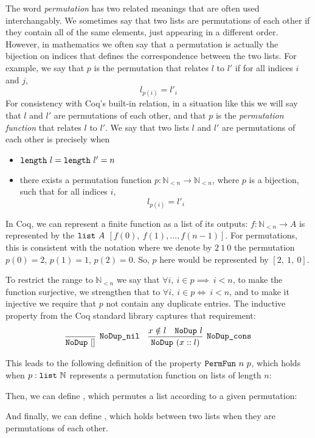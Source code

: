 \documentclass[11pt]{thesis}
\begin{document}
The word \textit{permutation} has two related meanings that are often
used interchangably. We sometimes say that two lists are permutations of each
other if they contain all of the same elements, just appearing in a
different order. However, in mathematics we often say that a
permutation is actually the bijection on indices that defines the
correspondence between the two lists. For example, we say that $p$ is
the permutation that relates $l$ to $l'$ if for all indices $i$ and
$j$,
\begin{equation*}
  l_{p(i)} = l'_i
\end{equation*}
For consistency with Coq's built-in  relation, in a
situation like this we will say that $l$ and $l'$ are permutations of
each other, and that $p$ is the \textit{permutation function} that
relates $l$ to $l'$. We say that two lists $l$ and $l'$ are
permutations of each other is precisely when
\vspace{-\parskip}
\begin{itemize}[nolistsep]
  \item $\texttt{length}~l = \texttt{length}~l' = n$
  \item there exists a permutation function $p : \mathbb{N}_{<n} \to
    \mathbb{N}_{<n}$, where $p$ is a bijection, such that for all indices $i$,
    \begin{equation*}
      l_{p(i)} = l'_i
    \end{equation*}
\end{itemize}

In Coq, we can represent a finite function as a list of its outputs:
$f : \mathbb{N}_{<n} \to A$ is represented by the $\texttt{list}~A$
$[f(0),~f(1),\ldots,f(n-1)]$. For permutations, this is consistent with the
notation where we denote by $2~1~0$ the permutation $p(0) = 2$, $p(1)
= 1$, $p(2) = 0$. So, $p$ here would be represented by $[2,~1,~0]$.

To restrict the range to $\mathbb{N}_{<n}$ we say that $\forall i,~i \in p
\implies ~i<n$, to make the function surjective, we strengthen that to
$\forall i,~i \in p \iff ~i<n$, and to make it injective we require that $p$ not
contain any duplicate entries. The inductive property  from
the Coq standard library captures that requirement:
\begin{align*}
  \infer[\var{NoDup\_nil}]{\var{NoDup}~[]}{}
  &&
  \infer[\var{NoDup\_cons}]{\var{NoDup}~(x :: l)}{%
    x \notin l & \var{NoDup}~l
  }
\end{align*}

This leads to the following definition of the property
$\texttt{PermFun}~n~p$, which holds when $p : \texttt{list}~\mathbb{N}$
represents a permutation function on lists of length $n$:

Then, we can define , which permutes a list according to a
given permutation:

And finally, we can define , which holds between
two lists when they are permutations of each other.

\end{document}
